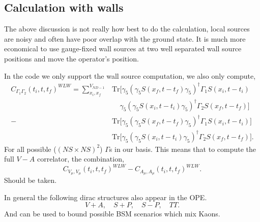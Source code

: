 \subsection{Calculation with walls}

The above discussion is not really how best to do the calculation, local sources
are noisy and often have poor overlap with the ground state. It is much more 
economical to use gauge-fixed wall sources at two well separated wall source
positions and move the operator's position.

In the code we only support the wall source computation, we also only compute,
\begin{equation}
\begin{aligned}
C_{\Gamma_1\Gamma_2}(t_i,t,t_f)^{WLW}=\sum_{x_i,x_f}^{V_{ND-1}}
&\text{Tr}\bigg[
\gamma_5 ( \gamma_5 S(x_f,t-t_f) \gamma_5 )^{\dagger} \Gamma_1 S(x_i,t-t_i)\\
&\:\:\:\:\:\gamma_5 ( \gamma_5 S(x_i,t-t_i) \gamma_5 )^{\dagger} \Gamma_2 S(x_f,t-t_f)
\bigg]\\
-&\text{Tr}\bigg[ 
  \gamma_5 ( \gamma_5 S(x_f,t-t_f) \gamma_5 )^{\dagger} \Gamma_1 S(x_i,t-t_i)
\bigg] \\
&\text{Tr}\bigg[ 
  \gamma_5 ( \gamma_5 S(x_i,t-t_i) \gamma_5 )^{\dagger} \Gamma_2 S(x_f,t-t_f)
\bigg].
\end{aligned}
\end{equation}
For all possible ($(NS\times NS)^2$) $\Gamma$s in our basis. This means that to
compute the full $V-A$ correlator, the combination,
\begin{equation}
C_{V_\mu,V_\mu}(t_i,t,t_f)^{WLW} - C_{A_\mu,A_\mu}(t_i,t,t_f)^{WLW}.
\end{equation}
Should be taken.

In general the following dirac structures also appear in the OPE.
\begin{equation}
V+A,\quad S+P ,\quad S-P ,\quad TT.
\end{equation}
And can be used to bound possible BSM scenarios which mix Kaons.
